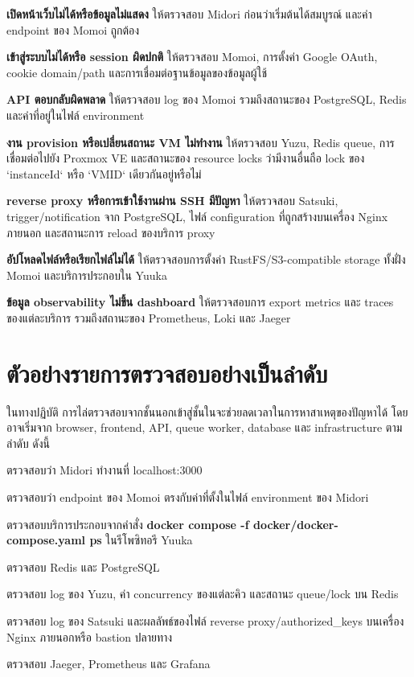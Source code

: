 \begin{mycustomenum2}
    \item \textbf{เปิดหน้าเว็บไม่ได้หรือข้อมูลไม่แสดง} ให้ตรวจสอบ Midori ก่อนว่าเริ่มต้นได้สมบูรณ์ และค่า endpoint ของ Momoi ถูกต้อง
    \item \textbf{เข้าสู่ระบบไม่ได้หรือ session ผิดปกติ} ให้ตรวจสอบ Momoi, การตั้งค่า Google OAuth, cookie domain/path และการเชื่อมต่อฐานข้อมูลของข้อมูลผู้ใช้
    \item \textbf{API ตอบกลับผิดพลาด} ให้ตรวจสอบ log ของ Momoi รวมถึงสถานะของ PostgreSQL, Redis และค่าที่อยู่ในไฟล์ environment
    \item \textbf{งาน provision หรือเปลี่ยนสถานะ VM ไม่ทำงาน} ให้ตรวจสอบ Yuzu, Redis queue, การเชื่อมต่อไปยัง Proxmox VE และสถานะของ resource locks ว่ามีงานอื่นถือ lock ของ `instanceId` หรือ `VMID` เดียวกันอยู่หรือไม่
    \item \textbf{reverse proxy หรือการเข้าใช้งานผ่าน SSH มีปัญหา} ให้ตรวจสอบ Satsuki, trigger/notification จาก PostgreSQL, ไฟล์ configuration ที่ถูกสร้างบนเครื่อง Nginx ภายนอก และสถานะการ reload ของบริการ proxy
    \item \textbf{อัปโหลดไฟล์หรือเรียกไฟล์ไม่ได้} ให้ตรวจสอบการตั้งค่า RustFS/S3-compatible storage ทั้งฝั่ง Momoi และบริการประกอบใน Yuuka
    \item \textbf{ข้อมูล observability ไม่ขึ้น dashboard} ให้ตรวจสอบการ export metrics และ traces ของแต่ละบริการ รวมถึงสถานะของ Prometheus, Loki และ Jaeger
\end{mycustomenum2}

\section{ตัวอย่างรายการตรวจสอบอย่างเป็นลำดับ}
\hspace*{1.3em}
ในทางปฏิบัติ การไล่ตรวจสอบจากชั้นนอกเข้าสู่ชั้นในจะช่วยลดเวลาในการหาสาเหตุของปัญหาได้ โดยอาจเริ่มจาก browser, frontend, API, queue worker, database และ infrastructure ตามลำดับ ดังนี้

\begin{mycustomenum2}
    \item ตรวจสอบว่า Midori ทำงานที่ localhost:3000
    \item ตรวจสอบว่า endpoint ของ Momoi ตรงกับค่าที่ตั้งในไฟล์ environment ของ Midori
    \item ตรวจสอบบริการประกอบจากคำสั่ง \textbf{docker compose -f docker/docker-compose.yaml ps} ในรีโพซิทอรี Yuuka
    \item ตรวจสอบ Redis และ PostgreSQL
    \item ตรวจสอบ log ของ Yuzu, ค่า concurrency ของแต่ละคิว และสถานะ queue/lock บน Redis
    \item ตรวจสอบ log ของ Satsuki และผลลัพธ์ของไฟล์ reverse proxy/authorized\_keys บนเครื่อง Nginx ภายนอกหรือ bastion ปลายทาง
    \item ตรวจสอบ Jaeger, Prometheus และ Grafana
\end{mycustomenum2}

